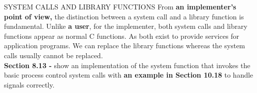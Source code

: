 \documentclass{beamer}
\begin{document}
\begin{frame}[t]{SYSTEM CALLS AND LIBRARY FUNCTIONS}
From \textbf{an implementer's point of view,} the distinction between a system call and a library function is fundamental. Unlike \textbf{a user}, for the implementer, both system calls and library functions appear as normal C functions.  As both exist to provide services for application programs. We can replace the library functions whereas the system calls usually cannot be replaced.\\[6pt]
\textbf{Section 8.13 -} show an implementation of the system function that invokes the basic process control system calls with \textbf{an example in Section 10.18} to handle signals correctly.

\end{frame}
\end{document}
